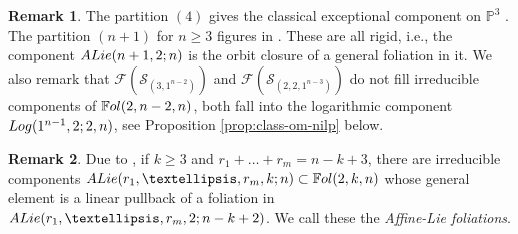 \documentclass[twoside]{amsart}
\numberwithin{equation}{section}
\newcommand{\p}[1]{{\mathbb{P}^{#1}}}
\DeclareMathOperator{\codim}{codim}
\def\CC{{\mathbb{C}}}
\newcommand{\Fol}{\mathbb{F}{\rm ol}}
\newcommand{\del}[1]{\frac{\partial}{\partial #1}}
\newcommand{\logg}[3]{{\rm Log}(#1;#2,#3)}
\newcommand{\exc}[3]{{\rm ALie}(#1,#2;#3)}
\theoremstyle{definition}
\newtheorem{remark}{Remark}[section]
\begin{document}


\begin{remark}\label{Alg: log(1,2)} 
The partition $(4)$ gives the classical exceptional component on $\p3$ \cite{CLN}. The partition $(n+1)$ for $n\geq 3$ figures in \cite[Example 6.8]{CP1}. These are all rigid, i.e., the component $\exc{n+1}{2}{n}$ is the orbit closure of a general foliation in it. We also remark that $\mathcal{F}(\mathcal{S}_{(3,1^{n-2})})$  and $\mathcal{F}(\mathcal{S}_{(2,2,1^{n-3})})$ do not fill irreducible components of $\Fol(2,n-2,n)$, both fall into the logarithmic component $\logg{1^{n-1},2}{2}{n}$, see Proposition \ref{prop:class-om-nilp} below.
\end{remark}

\begin{remark}\label{rem:exceptional}
Due to \cite[Corollary 5.1]{CP1}, if $k\geq 3$ and $r_1 + \dots + r_m = n-k+3$, there are irreducible components $\exc{r_1, \dots, r_m}{k}{n} \subset \Fol(2,k,n)$ whose general element is a linear pullback of a foliation in $\exc{r_1, \dots, r_m}{2}{n-k+2}$.  We call these the \emph{Affine-Lie foliations}.   
\end{remark}
\end{document}
